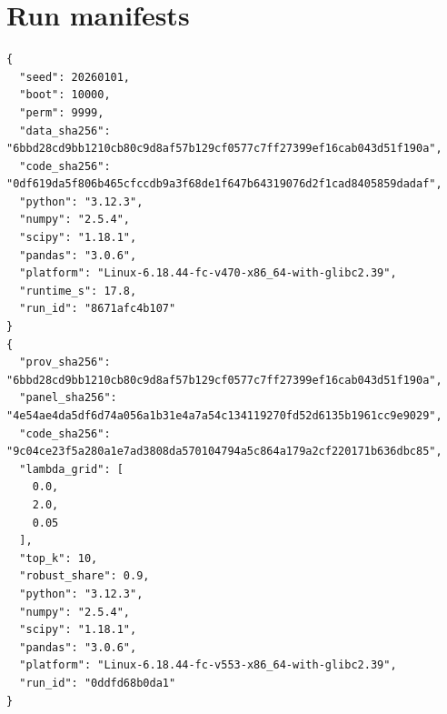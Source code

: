 \documentclass[10pt,a4paper]{article}
\begin{document}
\section{Run manifests}
\begin{lstlisting}[numbers=none]
{
  "seed": 20260101,
  "boot": 10000,
  "perm": 9999,
  "data_sha256": "6bbd28cd9bb1210cb80c9d8af57b129cf0577c7ff27399ef16cab043d51f190a",
  "code_sha256": "0df619da5f806b465cfccdb9a3f68de1f647b64319076d2f1cad8405859dadaf",
  "python": "3.12.3",
  "numpy": "2.5.4",
  "scipy": "1.18.1",
  "pandas": "3.0.6",
  "platform": "Linux-6.18.44-fc-v470-x86_64-with-glibc2.39",
  "runtime_s": 17.8,
  "run_id": "8671afc4b107"
}
{
  "prov_sha256": "6bbd28cd9bb1210cb80c9d8af57b129cf0577c7ff27399ef16cab043d51f190a",
  "panel_sha256": "4e54ae4da5df6d74a056a1b31e4a7a54c134119270fd52d6135b1961cc9e9029",
  "code_sha256": "9c04ce23f5a280a1e7ad3808da570104794a5c864a179a2cf220171b636dbc85",
  "lambda_grid": [
    0.0,
    2.0,
    0.05
  ],
  "top_k": 10,
  "robust_share": 0.9,
  "python": "3.12.3",
  "numpy": "2.5.4",
  "scipy": "1.18.1",
  "pandas": "3.0.6",
  "platform": "Linux-6.18.44-fc-v553-x86_64-with-glibc2.39",
  "run_id": "0ddfd68b0da1"
}
\end{lstlisting}
\end{document}
